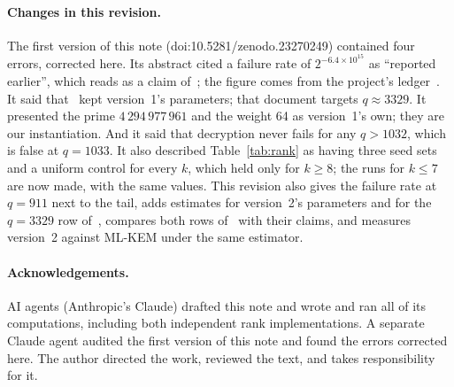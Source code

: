 \documentclass[11pt]{article}
\theoremstyle{remark}
\begin{document}
\paragraph{Changes in this revision.} The first version of this note (doi:10.5281/zenodo.23270249) contained four
errors, corrected here. Its abstract cited a failure rate of $2^{-6.4\times10^{15}}$ as ``reported earlier'', which reads
as a claim of~\cite{Gif26a}; the figure comes from the project's ledger~\cite{Led}. It said that~\cite{Gif26b} kept
version~1's parameters; that document targets $q\approx3329$. It presented the prime $4\,294\,977\,961$ and the weight 64
as version~1's own; they are our instantiation. And it said that decryption never fails for any $q>1032$, which is false
at $q=1033$. It also described Table~\ref{tab:rank} as having three seed sets and a uniform control for every $k$, which
held only for $k\ge8$; the runs for $k\le7$ are now made, with the same values. This revision also gives the failure
rate at $q=911$ next to the tail, adds estimates for version~2's parameters and for the $q=3329$ row of~\cite{Gif26b},
compares both rows of~\cite{Gif26b} with their claims, and measures version~2 against ML-KEM under the same estimator.

\paragraph{Acknowledgements.} AI agents (Anthropic's Claude) drafted this note and wrote and ran all of its computations, including both independent rank implementations. A separate Claude agent audited the first version of this note and found the errors corrected here. The author directed the work, reviewed the text, and takes responsibility for it.
\end{document}
